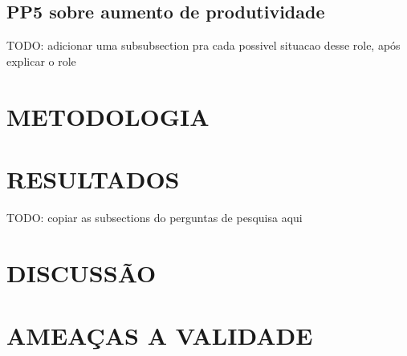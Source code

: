 \subsection{PP5 sobre aumento de produtividade}
TODO: adicionar uma subsubsection pra cada possivel situacao desse role, após explicar o role

\section{METODOLOGIA}
\section{RESULTADOS}
TODO: copiar as subsections do perguntas de pesquisa aqui

\section{DISCUSSÃO}
\section{AMEAÇAS A VALIDADE}
